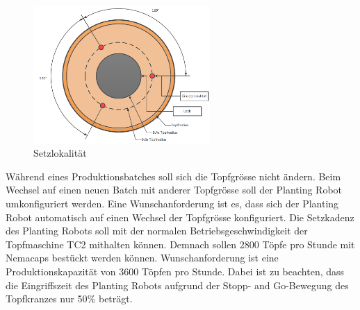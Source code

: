 \begin{figure}[H]
	\includegraphics[width=0.6\textwidth]{Illustrationen/4-Entwurf/Setzprozess.png}
	\caption{Setzlokalität}
	\label{fig:Setzprozess}
\end{figure}

Während eines Produktionsbatches soll sich die Topfgrösse nicht ändern. Beim Wechsel auf einen neuen Batch mit anderer Topfgrösse soll der Planting Robot umkonfiguriert werden. Eine Wunschanforderung ist es, dass sich der Planting Robot automatisch auf einen Wechsel der Topfgrösse konfiguriert. Die Setzkadenz des Planting Robots soll mit der normalen Betriebsgeschwindigkeit der Topfmaschine TC2 mithalten können. Demnach sollen 2800 Töpfe pro Stunde mit Nemacaps bestückt werden können. Wunschanforderung ist eine Produktionskapazität von 3600 Töpfen pro Stunde. Dabei ist zu beachten, dass die Eingriffszeit des Planting Robots aufgrund der Stopp- and Go-Bewegung des Topfkranzes nur 50$\%$ beträgt.